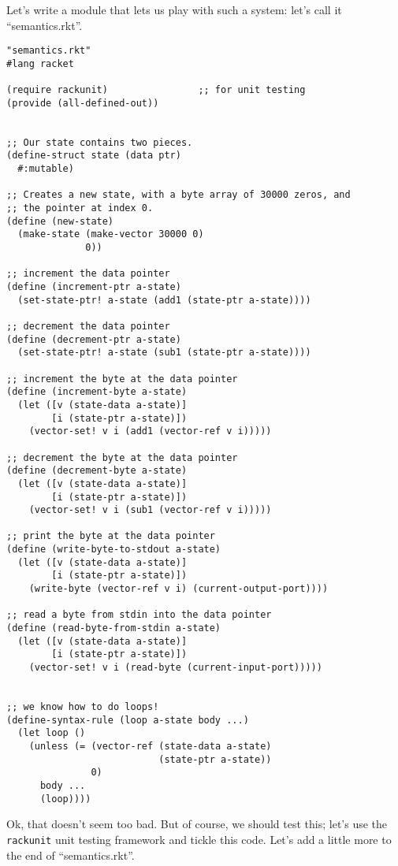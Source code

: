 \documentclass{article}
\begin{document}
Let's write a module that lets us play with such a system: let's call it ``semantics.rkt''.
\begin{verbatim}
"semantics.rkt"
#lang racket
 
(require rackunit)                ;; for unit testing
(provide (all-defined-out))
 
 
;; Our state contains two pieces.
(define-struct state (data ptr)
  #:mutable)
 
;; Creates a new state, with a byte array of 30000 zeros, and
;; the pointer at index 0.
(define (new-state)
  (make-state (make-vector 30000 0)
              0))
 
;; increment the data pointer
(define (increment-ptr a-state)
  (set-state-ptr! a-state (add1 (state-ptr a-state))))
 
;; decrement the data pointer
(define (decrement-ptr a-state)
  (set-state-ptr! a-state (sub1 (state-ptr a-state))))
 
;; increment the byte at the data pointer
(define (increment-byte a-state)
  (let ([v (state-data a-state)]
        [i (state-ptr a-state)])
    (vector-set! v i (add1 (vector-ref v i)))))
 
;; decrement the byte at the data pointer
(define (decrement-byte a-state)
  (let ([v (state-data a-state)]
        [i (state-ptr a-state)])
    (vector-set! v i (sub1 (vector-ref v i)))))
 
;; print the byte at the data pointer
(define (write-byte-to-stdout a-state)
  (let ([v (state-data a-state)]
        [i (state-ptr a-state)])
    (write-byte (vector-ref v i) (current-output-port))))
 
;; read a byte from stdin into the data pointer
(define (read-byte-from-stdin a-state)
  (let ([v (state-data a-state)]
        [i (state-ptr a-state)])
    (vector-set! v i (read-byte (current-input-port)))))
 
 
;; we know how to do loops!
(define-syntax-rule (loop a-state body ...)
  (let loop ()
    (unless (= (vector-ref (state-data a-state)
                           (state-ptr a-state))
               0)
      body ...
      (loop))))
\end{verbatim}
Ok, that doesn't seem too bad. But of course, we should test this; let's use the \verb|rackunit| unit testing framework and tickle this code. Let's add a little more to the end of ``semantics.rkt''.
\end{document}
